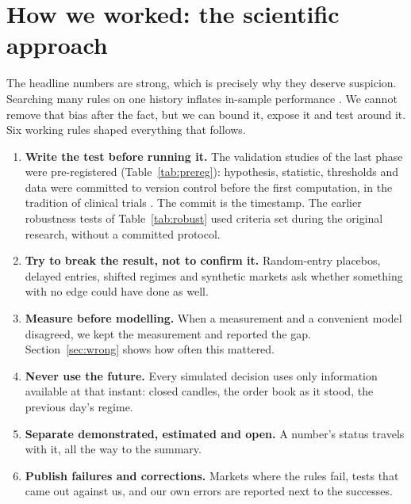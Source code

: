 \documentclass[11pt,a4paper]{article}
\newcommand{\question}[1]{\par\vspace{-2pt}{\sffamily\itshape\color{accent}#1}\par\vspace{6pt}}
\begin{document}
\newpage
\section{How we worked: the scientific approach}\label{sec:method}
\question{``Why should I believe any of this?''}

The headline numbers are strong, which is precisely why they deserve suspicion. Searching many rules on one history inflates
in-sample performance \citep{white2000,bailey2014,harvey2016}. We cannot remove that bias after the fact, but we can bound it,
expose it and test around it. Six working rules shaped everything that follows.

\begin{enumerate}[label={\sffamily\bfseries\color{accent}\arabic*.},leftmargin=1.6em]
\item \textbf{Write the test before running it.} The validation studies of the last phase were pre-registered (Table~\ref{tab:prereg}):
  hypothesis, statistic, thresholds and data were committed to version control before the first computation, in the tradition
  of clinical trials \citep{nosek2018}. The commit is the timestamp. The earlier robustness tests of Table~\ref{tab:robust} used
  criteria set during the original research, without a committed protocol.
\item \textbf{Try to break the result, not to confirm it.} Random-entry placebos, delayed entries, shifted regimes and
  synthetic markets ask whether something with no edge could have done as well.
\item \textbf{Measure before modelling.} When a measurement and a convenient model disagreed, we kept the measurement and
  reported the gap. Section~\ref{sec:wrong} shows how often this mattered.
\item \textbf{Never use the future.} Every simulated decision uses only information available at that instant: closed
  candles, the order book as it stood, the previous day's regime.
\item \textbf{Separate demonstrated, estimated and open.} A number's status travels with it, all the way to the summary.
\item \textbf{Publish failures and corrections.} Markets where the rules fail, tests that came out against us, and our own
  errors are reported next to the successes.
\end{enumerate}
\end{document}
